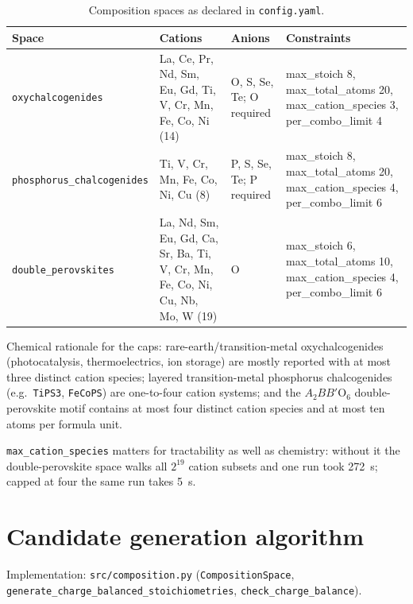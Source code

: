 \documentclass[11pt,a4paper]{article}
\newcommand{\pkg}[1]{\texttt{#1}}
\newcommand{\code}[1]{\texttt{#1}}
\begin{document}
\begin{table}[h]
\centering
\footnotesize
\begin{tabular}{@{}p{3.5cm} p{4.9cm} p{2.0cm} p{3.4cm}@{}}
\toprule
Space & Cations & Anions & Constraints\\
\midrule
\code{oxychalcogenides} &
La, Ce, Pr, Nd, Sm, Eu, Gd, Ti, V, Cr, Mn, Fe, Co, Ni (14) &
O, S, Se, Te; O required &
max\_stoich 8, max\_total\_atoms 20, max\_cation\_species 3, per\_combo\_limit 4\\
\addlinespace
\code{phosphorus\_\allowbreak chalcogenides} &
Ti, V, Cr, Mn, Fe, Co, Ni, Cu (8) &
P, S, Se, Te; P required &
max\_stoich 8, max\_total\_atoms 20, max\_cation\_species 4, per\_combo\_limit 6\\
\addlinespace
\code{double\_perovskites} &
La, Nd, Sm, Eu, Gd, Ca, Sr, Ba, Ti, V, Cr, Mn, Fe, Co, Ni, Cu, Nb, Mo, W (19) &
O &
max\_stoich 6, max\_total\_atoms 10, max\_cation\_species 4, per\_combo\_limit 6\\
\bottomrule
\end{tabular}
\caption{Composition spaces as declared in \code{config.yaml}.}
\label{tab:spaces}
\end{table}

Chemical rationale for the caps: rare-earth/transition-metal oxychalcogenides (photocatalysis,
thermoelectrics, ion storage) are mostly reported with at most three distinct cation species;
layered transition-metal phosphorus chalcogenides (e.g.\ \code{TiPS3}, \code{FeCoPS}) are
one-to-four cation systems; and the $A_2BB'\mathrm{O}_6$ double-perovskite motif contains at most
four distinct cation species and at most ten atoms per formula unit.

\code{max\_cation\_species} matters for tractability as well as chemistry: without it the
double-perovskite space walks all $2^{19}$ cation subsets and one run took \SI{272}{s}; capped at
four the same run takes \SI{5}{s}.

\section{Candidate generation algorithm}

Implementation: \pkg{src/composition.py} (\code{CompositionSpace},
\code{generate\_charge\_balanced\_\allowbreak stoichiometries},
\code{check\_charge\_balance}).
\end{document}

